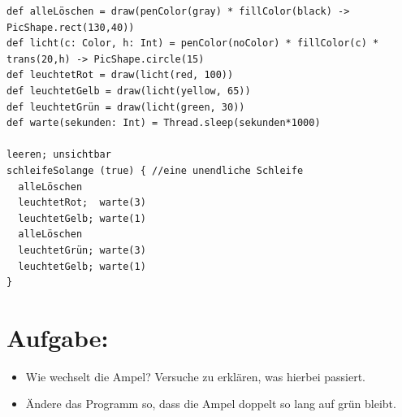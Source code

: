 \begin{lstlisting}[basicstyle={\ttfamily\fontsize{14}{17}\selectfont},numbers=none]
def alleLöschen = draw(penColor(gray) * fillColor(black) -> PicShape.rect(130,40))
def licht(c: Color, h: Int) = penColor(noColor) * fillColor(c) * trans(20,h) -> PicShape.circle(15)
def leuchtetRot = draw(licht(red, 100))
def leuchtetGelb = draw(licht(yellow, 65))
def leuchtetGrün = draw(licht(green, 30))
def warte(sekunden: Int) = Thread.sleep(sekunden*1000)

leeren; unsichtbar  
schleifeSolange (true) { //eine unendliche Schleife
  alleLöschen
  leuchtetRot;  warte(3)
  leuchtetGelb; warte(1) 
  alleLöschen
  leuchtetGrün; warte(3)
  leuchtetGelb; warte(1)
}
\end{lstlisting}
        
\section*{\color{BrickRed}Aufgabe:}


\begin{itemize}

\item {Wie wechselt die Ampel? Versuche zu erklären, was hierbei passiert.}
\item {Ändere das Programm so, dass die Ampel doppelt so lang auf grün bleibt.}

\end{itemize}


